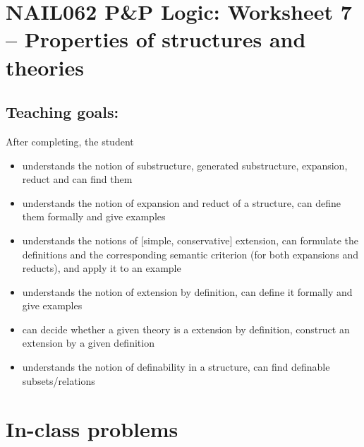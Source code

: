 \section*{NAIL062 P\&P Logic: Worksheet 7 -- Properties of structures and theories}


\subsection*{Teaching goals:} After completing, the student

    \begin{itemize}\setlength{\itemsep}{0pt}
        \item understands the notion of substructure, generated substructure, expansion, reduct and can find them
        \item understands the notion of expansion and reduct of a structure, can define them formally and give examples
        \item understands the notions of [simple, conservative] extension, can formulate the definitions and the corresponding semantic criterion (for both expansions and reducts), and apply it to an example
        \item understands the notion of extension by definition, can define it formally and give examples
        \item can decide whether a given theory is a extension by definition, construct an extension by a given definition
        \item understands the notion of definability in a structure, can find definable subsets/relations
    \end{itemize}

    

\section*{In-class problems}


